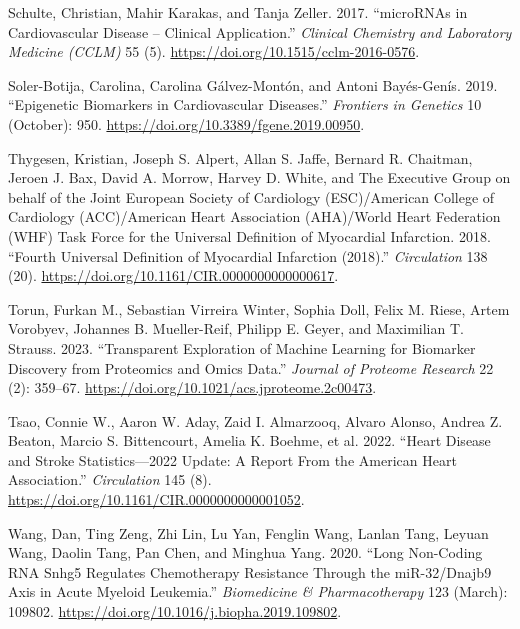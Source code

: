 \documentclass[
]{article}
\newlength{\cslhangindent}
\newlength{\cslentryspacingunit} %
\newenvironment{CSLReferences}[2] %
 {%
  \setlength{\parindent}{0pt}
  \ifodd #1
  \let\oldpar\par
  \def\par{\hangindent=\cslhangindent\oldpar}
  \fi
  \setlength{\parskip}{#2\cslentryspacingunit}
 }%
 {}
\begin{document}
\begin{CSLReferences}{1}{0}
\leavevmode{}%
Schulte, Christian, Mahir Karakas, and Tanja Zeller. 2017.
{``{microRNAs} in Cardiovascular Disease -- Clinical Application.''}
\emph{Clinical Chemistry and Laboratory Medicine (CCLM)} 55 (5).
\url{https://doi.org/10.1515/cclm-2016-0576}.

\leavevmode{}%
Soler-Botija, Carolina, Carolina Gálvez-Montón, and Antoni Bayés-Genís.
2019. {``Epigenetic {Biomarkers} in {Cardiovascular} {Diseases}.''}
\emph{Frontiers in Genetics} 10 (October): 950.
\url{https://doi.org/10.3389/fgene.2019.00950}.

\leavevmode{}%
Thygesen, Kristian, Joseph S. Alpert, Allan S. Jaffe, Bernard R.
Chaitman, Jeroen J. Bax, David A. Morrow, Harvey D. White, and The
Executive Group on behalf of the Joint European Society of Cardiology
(ESC)/American College of Cardiology (ACC)/American Heart Association
(AHA)/World Heart Federation (WHF) Task Force for the Universal
Definition of Myocardial Infarction. 2018. {``Fourth {Universal}
{Definition} of {Myocardial} {Infarction} (2018).''} \emph{Circulation}
138 (20). \url{https://doi.org/10.1161/CIR.0000000000000617}.

\leavevmode{}%
Torun, Furkan M., Sebastian Virreira Winter, Sophia Doll, Felix M.
Riese, Artem Vorobyev, Johannes B. Mueller-Reif, Philipp E. Geyer, and
Maximilian T. Strauss. 2023. {``Transparent {Exploration} of {Machine}
{Learning} for {Biomarker} {Discovery} from {Proteomics} and {Omics}
{Data}.''} \emph{Journal of Proteome Research} 22 (2): 359--67.
\url{https://doi.org/10.1021/acs.jproteome.2c00473}.

\leavevmode{}%
Tsao, Connie W., Aaron W. Aday, Zaid I. Almarzooq, Alvaro Alonso, Andrea
Z. Beaton, Marcio S. Bittencourt, Amelia K. Boehme, et al. 2022.
{``Heart {Disease} and {Stroke} {Statistics}---2022 {Update}: {A}
{Report} {From} the {American} {Heart} {Association}.''}
\emph{Circulation} 145 (8).
\url{https://doi.org/10.1161/CIR.0000000000001052}.

\leavevmode{}%
Wang, Dan, Ting Zeng, Zhi Lin, Lu Yan, Fenglin Wang, Lanlan Tang, Leyuan
Wang, Daolin Tang, Pan Chen, and Minghua Yang. 2020. {``Long Non-Coding
{RNA} {Snhg5} Regulates Chemotherapy Resistance Through the
{miR}-32/{Dnajb9} Axis in Acute Myeloid Leukemia.''} \emph{Biomedicine
\& Pharmacotherapy} 123 (March): 109802.
\url{https://doi.org/10.1016/j.biopha.2019.109802}.


\end{CSLReferences}
\end{document}
